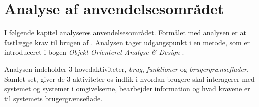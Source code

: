 \chapter{Analyse af anvendelsesområdet}
\label{chap:analyseafao}

I følgende kapitel analyseres anvendelsesområdet. Formålet med analysen er at fastlægge krav til brugen af \Foodl{}. Analysen tager udgangspunkt i en metode, som er introduceret i bogen \emph{Objekt Orienteret Analyse \& Design} \cite[s. ~113]{ooad}. 

Analysen indeholder 3 hovedaktiviteter, \textit{brug}, \textit{funktioner} og \textit{brugergrænseflader}. Samlet set, giver de 3 aktiviteter os indlik i hvordan brugere skal interagerer med systemet og systemer i omgivelserne, bearbejder information og hvad kravene er til systemets brugergrænseflade\cite[s. ~115]{ooad}.




